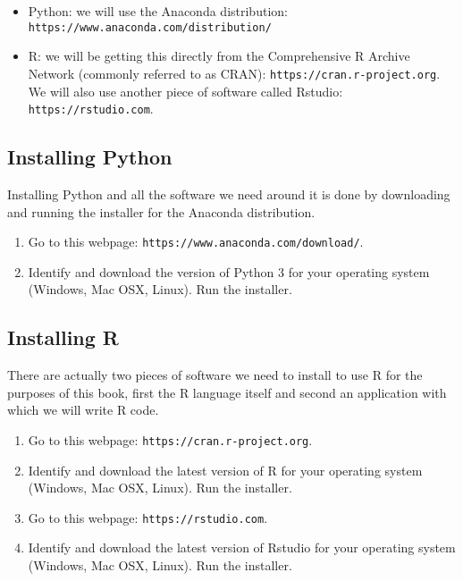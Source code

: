 \begin{itemize}
    \item Python: we will use the Anaconda distribution:
        \texttt{https://www.anaconda.com/distribution/}
    \item R: we will be getting this directly from the Comprehensive R Archive
        Network (commonly referred to as CRAN):
        \texttt{https://cran.r-project.org}. We will also use another piece of
        software called Rstudio: \texttt{https://rstudio.com}.
\end{itemize}

\subsection{Installing Python}\label{sec:installing-python}

Installing Python and all the software we need around it is done by downloading
and running the installer for the Anaconda distribution.

\begin{enumerate}
    \item Go to this webpage: \texttt{https://www.anaconda.com/download/}.
    \item Identify and download the version of Python 3 for your operating system
        (Windows, Mac OSX, Linux). Run the installer.
\end{enumerate}

\subsection{Installing R}\label{sec:installing-R}

There are actually two pieces of software we need to install to use R for the
purposes of this book, first the R language itself and second an application
with which we will write R code.

\begin{enumerate}
    \item Go to this webpage: \texttt{https://cran.r-project.org}.
    \item Identify and download the latest version of R for your operating system
        (Windows, Mac OSX, Linux). Run the installer.
    \item Go to this webpage: \texttt{https://rstudio.com}.
    \item Identify and download the latest version of Rstudio for your operating system
        (Windows, Mac OSX, Linux). Run the installer.
\end{enumerate}

